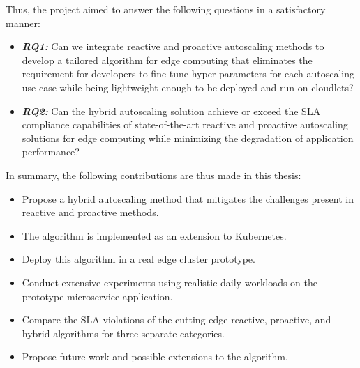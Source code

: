 Thus, the project aimed to answer the following questions in a satisfactory manner:
\begin{itemize}
    \item \textbf{\textit{RQ1:}} Can we integrate reactive and proactive autoscaling methods to develop a tailored algorithm for edge computing that eliminates the requirement for developers to fine-tune hyper-parameters for each autoscaling use case while being lightweight enough to be deployed and run on cloudlets?
    \item \textbf{\textit{RQ2:}} Can the hybrid autoscaling solution achieve or exceed the SLA compliance capabilities of state-of-the-art reactive and proactive autoscaling solutions for edge computing while minimizing the degradation of application performance?
\end{itemize}

In summary, the following contributions are thus made in this thesis:

\begin{itemize}
    \item Propose a hybrid autoscaling method that mitigates the challenges present in reactive and proactive methods.
    \item The algorithm is implemented as an extension to Kubernetes.
    \item Deploy this algorithm in a real edge cluster prototype.
    \item Conduct extensive experiments using realistic daily workloads on the prototype microservice application.
    \item Compare the SLA violations of the cutting-edge reactive, proactive, and hybrid algorithms for three separate categories.
    \item Propose future work and possible extensions to the algorithm.
\end{itemize}
